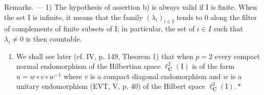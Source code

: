 Remarks. --- 1) The hypothesis of assertion b) is always valid if I is finite. When the set I is infinite, it means that the family \((\lambda_{i})_{i\in\mathrm{I}}\) tends to 0 along the filter of complements of finite subsets of I; in particular, the set of \(i\in I\) such that \(\lambda_{i}\neq0\) is then countable.

\begin{enumerate}
\def\labelenumi{\arabic{enumi})}
\setcounter{enumi}{1}
\tightlist
\item
  We shall see later (cf. IV, p. 149, Theorem 1) that when \(p = 2\) every compact normal endomorphism of the Hilbertian space \(\ell_{\mathbf{C}}^{2}(\mathrm{I})\) is of the form \(u = w \circ v \circ w^{-1}\) where \(v\) is a compact diagonal endomorphism and \(w\) is a unitary endomorphism (EVT, V, p. 40) of the Hilbert space \(\ell_{\mathbf{C}}^{2}(\mathrm{I}).*\)
\end{enumerate}

